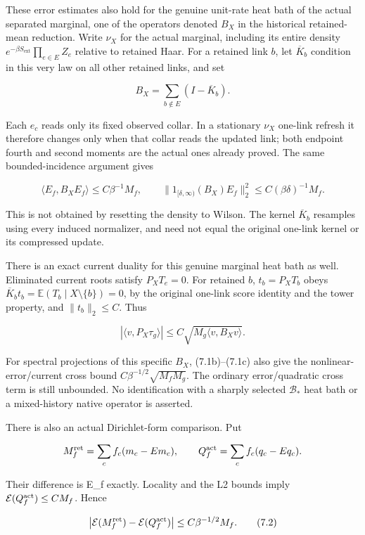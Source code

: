 \documentclass[
  11pt,
]{article}
\begin{document}
These error estimates also hold for the genuine unit-rate heat bath of
the actual separated marginal, one of the operators denoted \(B_X\) in
the historical retained-mean reduction. Write \(\nu_X\) for the actual
marginal, including its entire density
\(e^{-\beta S_{\mathrm{ext}}}\prod_{e\in E}Z_e\) relative to retained
Haar. For a retained link \(b\), let \(\overline K_b\) condition in this
very law on all other retained links, and set

\[
 B_X=\sum_{b\notin E}(I-\overline K_b).
 \tag{7.1a}
\]

Each \(e_c\) reads only its fixed observed collar. In a stationary
\(\nu_X\) one-link refresh it therefore changes only when that collar
reads the updated link; both endpoint fourth and second moments are the
actual ones already proved. The same bounded-incidence argument gives

\[
 \langle E_f,B_XE_f\rangle\le C\beta^{-1}M_f,
 \qquad
 \|1_{[\delta,\infty)}(B_X)E_f\|_2^2
 \le C(\beta\delta)^{-1}M_f.
 \tag{7.1b}
\]

This is not obtained by resetting the density to Wilson. The kernel
\(\overline K_b\) resamples using every induced normalizer, and need not
equal the original one-link kernel or its compressed update.

There is an exact current duality for this genuine marginal heat bath as
well. Eliminated current roots satisfy \(P_XT_e=0\). For retained \(b\),
\(t_b=P_XT_b\) obeys
\(\overline K_b t_b=\mathbb E(T_b\mid X\setminus\{b\})=0\), by the
original one-link score identity and the tower property, and
\(\|t_b\|_2\le C\). Thus

\[
 |\langle v,P_X\tau_g\rangle|
 \le C\sqrt{M_g\langle v,B_Xv\rangle}.
 \tag{7.1c}
\]

For spectral projections of this specific \(B_X\), (7.1b)--(7.1c) also
give the nonlinear-error/current cross bound
\(C\beta^{-1/2}\sqrt{M_fM_g}\). The ordinary error/quadratic cross term
is still unbounded. No identification with a sharply selected
\(\mathcal B_*\) heat bath or a mixed-history native operator is
asserted.

There is also an actual Dirichlet-form comparison. Put

\[
 M_f^{\rm ret}=\sum_cf_c(m_c-Em_c),\qquad
 Q_f^{\rm act}=\sum_cf_c(q_c-Eq_c).
\]

Their difference is E\_f exactly. Locality and the L2 bounds imply
\(\mathcal E(Q_f^{\rm act})\le CM_f\). Hence

\[
 \left|\mathcal E(M_f^{\rm ret})
             -\mathcal E(Q_f^{\rm act})\right|
 \le C\beta^{-1/2}M_f.
\tag{7.2}
\]
\end{document}
